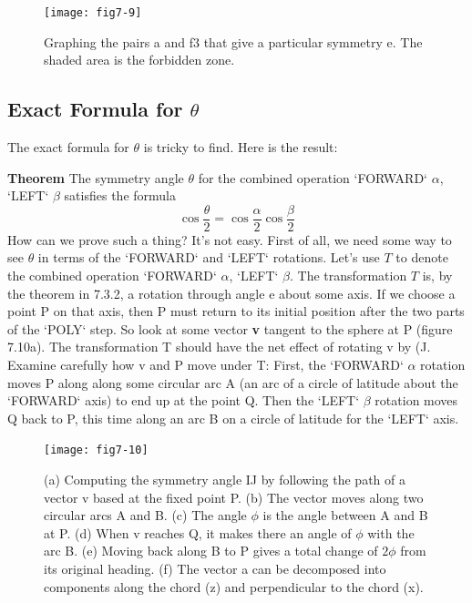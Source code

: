 \documentclass{book}
\begin{document}
\begin{figure}
\begin{center}
\texttt{[image: fig7-9]}
\caption{Graphing the pairs a and f3 that give a particular symmetry e. The shaded area is the forbidden zone.}
\end{center}
\end{figure}

\subsection{Exact Formula for $\theta$}

The exact formula for $\theta$ is tricky to find. Here is the result:

\textbf{Theorem} The symmetry angle $\theta$ for the combined operation \textsc{`FORWARD`} $\alpha$,
\textsc{`LEFT`} $\beta$ satisfies the formula
$$\cos \frac{\theta}{2} = \cos \frac{\alpha}{2} \cos \frac{\beta}{2} $$
How can we prove such a thing? It's not easy. First of all, we need some
way to see $\theta$ in terms of the \textsc{`FORWARD`} and \textsc{`LEFT`} rotations. Let's use $T$ to
denote the combined operation \textsc{`FORWARD`} $\alpha$, \textsc{`LEFT`} $\beta$. The transformation
$T$ is, by the theorem in 7.3.2, a rotation through angle e about some axis.
If we choose a point P on that axis, then P must return to its initial
position after the two parts of the \textsc{`POLY`} step. So look at some vector \textbf{v}
tangent to the sphere at P (figure 7.10a). The transformation T should
have the net effect of rotating v by (J. Examine carefully how v and P
move under T: First, the \textsc{`FORWARD`} $\alpha$ rotation moves P along along some
circular arc A (an arc of a circle of latitude about the \textsc{`FORWARD`} axis) to
end up at the point Q. Then the \textsc{`LEFT`} $\beta$ rotation moves Q back to P,
this time along an arc B on a circle of latitude for the \textsc{`LEFT`} axis.

\begin{figure}
\begin{center}
\texttt{[image: fig7-10]}
\caption{(a) Computing the symmetry angle IJ by following the path of a vector v based at the fixed point P. (b) The vector moves along two circular arcs A and B. (c) The angle $\phi$ is the angle between A and B at P. (d) When v reaches Q, it makes there an angle of $\phi$ with the arc B. (e) Moving back along B to P gives a total change of $2 \phi$ from its original heading. (f) The vector a can be decomposed into components along the chord (z) and perpendicular to the chord (x).}
\end{center}
\end{figure}
\end{document}
